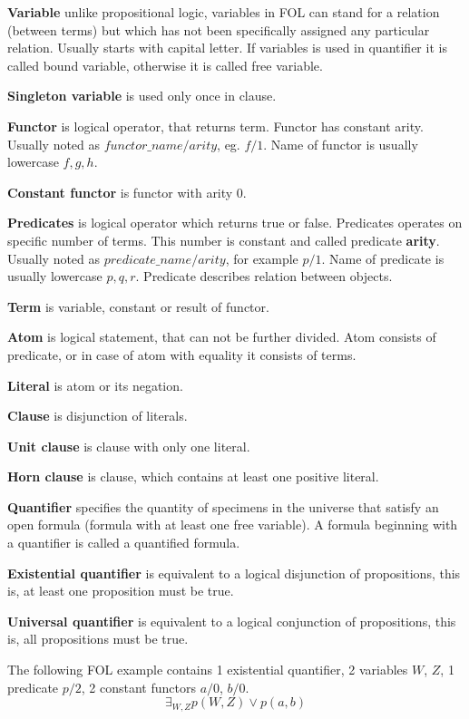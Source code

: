 \textbf{Variable}
unlike propositional logic, variables in \gls{FOL} can stand for a relation (between terms) but which has not been specifically assigned any particular relation.
Usually starts with capital letter. If variables is used in quantifier it is called bound variable, otherwise it is called free variable.

\textbf{Singleton variable}
is used only once in clause.

\textbf{Functor}
is logical operator, that returns term. Functor has constant arity. Usually noted as $functor\_name/arity$, eg. $f/1$. Name of functor  is usually lowercase $f, g, h$.

\textbf{Constant functor}
is functor with arity 0.

\textbf{Predicates}
is logical operator which returns true or false. Predicates operates on specific number of terms. This number is constant and called predicate \textbf{arity}. Usually noted as $predicate\_name/arity$, for example $p/1$. Name of predicate is usually lowercase $p, q, r$. Predicate describes relation between objects.

\textbf{Term}
is variable, constant or result of functor.

\textbf{Atom}
is logical statement, that can not be further divided. Atom consists of predicate, or in case of atom with equality it consists of terms.

\textbf{Literal}
is atom or its negation.

\textbf{Clause}
is disjunction of literals.

\textbf{Unit clause}
is clause with only one literal.

\textbf{Horn clause}
is clause, which contains at least one positive literal.

\textbf{Quantifier}
specifies the quantity of specimens in the universe that satisfy an open formula (formula with at least one free variable). A formula beginning with a quantifier is called a quantified formula.

\textbf{Existential quantifier}
is equivalent to a logical disjunction of propositions, this is, at least one proposition must be true.

\textbf{Universal quantifier}
is equivalent to a logical conjunction of propositions, this is, all propositions must be true.

The following \gls{FOL} example contains 1 existential quantifier, 2 variables $W$, $Z$, 1 predicate $p/2$, 2 constant functors $a/0$, $b/0$.
\begin{equation} \label{eg:FOL_1}
  \exists_{W,Z} p(W,Z) \lor p(a, b)
\end{equation}

